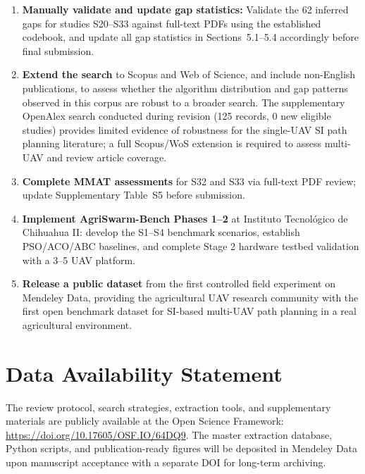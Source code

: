 \documentclass[review,3p,times]{elsarticle}
\begin{document}
\begin{enumerate}
  \item \textbf{Manually validate and update gap statistics:} Validate the 62 inferred gaps for studies S20--S33 against full-text PDFs using the established codebook, and update all gap statistics in Sections~5.1--5.4 accordingly before final submission.
  \item \textbf{Extend the search} to Scopus and Web of Science, and include non-English publications, to assess whether the algorithm distribution and gap patterns observed in this corpus are robust to a broader search. The supplementary OpenAlex search conducted during revision (125 records, 0 new eligible studies) provides limited evidence of robustness for the single-UAV SI path planning literature; a full Scopus/WoS extension is required to assess multi-UAV and review article coverage.
  \item \textbf{Complete MMAT assessments} for S32 and S33 via full-text PDF review; update Supplementary Table~S5 before submission.
  \item \textbf{Implement AgriSwarm-Bench Phases 1--2} at Instituto Tecnológico de Chihuahua II: develop the S1--S4 benchmark scenarios, establish PSO/ACO/ABC baselines, and complete Stage 2 hardware testbed validation with a 3--5 UAV platform.
  \item \textbf{Release a public dataset} from the first controlled field experiment on Mendeley Data, providing the agricultural UAV research community with the first open benchmark dataset for SI-based multi-UAV path planning in a real agricultural environment.
\end{enumerate}


\section*{Data Availability Statement}
The review protocol, search strategies, extraction tools, and supplementary 
materials are publicly available at the Open Science Framework: 
\url{https://doi.org/10.17605/OSF.IO/64DQ9}. 
The master extraction database, Python scripts, and publication-ready figures 
will be deposited in Mendeley Data upon manuscript acceptance with a separate 
DOI for long-term archiving.

\end{document}
